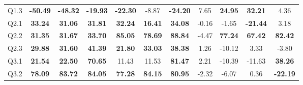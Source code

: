 \begin{table}
{\begin{tabular}{@{}ccccccccccc@{}}
    Q1.3                       & \multicolumn{1}{c}{\textbf{-50.49}}           & \multicolumn{1}{c}{\textbf{-48.32}}           & \textbf{-19.93}           & \multicolumn{1}{c}{\textbf{-22.30}}            & \multicolumn{1}{c}{-8.87}                    & \textbf{-24.20}           & \multicolumn{1}{c}{7.65}             & \multicolumn{1}{c}{\textbf{24.95}}   & \multicolumn{1}{c}{\textbf{32.21}}   & 4.36                            \\ 
    Q2.1                       & \multicolumn{1}{c}{\textbf{33.24}}            & \multicolumn{1}{c}{\textbf{31.06}}            & \textbf{31.81}            & \multicolumn{1}{c}{\textbf{32.24}}             & \multicolumn{1}{c}{\textbf{16.41}}           & \textbf{34.08}            & \multicolumn{1}{c}{-0.16}            & \multicolumn{1}{c}{-1.65}            & \multicolumn{1}{c}{\textbf{-21.44}}  & 3.18                            \\ 
    Q2.2                       & \multicolumn{1}{c}{\textbf{31.35}}            & \multicolumn{1}{c}{\textbf{31.67}}            & \textbf{33.70}            & \multicolumn{1}{c}{\textbf{85.05}}             & \multicolumn{1}{c}{\textbf{78.69}}           & \textbf{88.84}            & \multicolumn{1}{c}{-4.47}            & \multicolumn{1}{c}{\textbf{77.24}}   & \multicolumn{1}{c}{\textbf{67.42}}   & \textbf{82.42}                  \\ 
    Q2.3                       & \multicolumn{1}{c}{\textbf{29.88}}            & \multicolumn{1}{c}{\textbf{31.60}}            & \textbf{41.39}            & \multicolumn{1}{c}{\textbf{21.80}}             & \multicolumn{1}{c}{\textbf{33.03}}           & \textbf{38.38}            & \multicolumn{1}{c}{1.26}             & \multicolumn{1}{c}{-10.12}           & \multicolumn{1}{c}{3.33}             & -3.80                           \\ 
    Q3.1                       & \multicolumn{1}{c}{\textbf{21.54}}            & \multicolumn{1}{c}{\textbf{22.50}}            & \textbf{70.65}            & \multicolumn{1}{c}{11.43}                      & \multicolumn{1}{c}{11.53}                    & \textbf{81.47}            & \multicolumn{1}{c}{2.21}             & \multicolumn{1}{c}{-10.39}           & \multicolumn{1}{c}{-11.63}           & \textbf{38.26}                  \\ 
    Q3.2                       & \multicolumn{1}{c}{\textbf{78.09}}            & \multicolumn{1}{c}{\textbf{83.72}}            & \textbf{84.05}            & \multicolumn{1}{c}{\textbf{77.28}}             & \multicolumn{1}{c}{\textbf{84.15}}           & \textbf{80.95}            & \multicolumn{1}{c}{-2.32}            & \multicolumn{1}{c}{-6.07}            & \multicolumn{1}{c}{0.36}             & \textbf{-22.19}                 \\ 

\end{tabular}}
\end{table}
